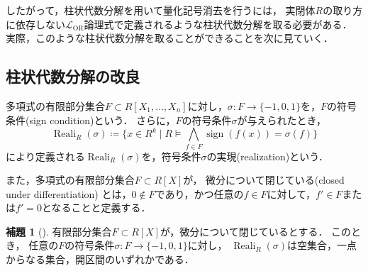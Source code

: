 \documentclass[uplatex, dvipdfmx]{jsarticle}
\numberwithin{equation}{section}
\newcommand{\Z}{\mathbb{Z}}
\newcommand{\map}[3]{{#1}\colon{#2}\rightarrow{#3}}
\DeclareMathOperator{\Reali}{Reali}
\DeclareMathOperator{\sign}{sign}
\theoremstyle{definition}
\newtheorem{proposition}[definition]{命題}
\newtheorem{lemma}[definition]{補題}
\begin{document}
したがって，柱状代数分解を用いて量化記号消去を行うには，
実閉体$R$の取り方に依存しない$\mathcal{L}_\mathrm{OR}$論理式で定義されるような柱状代数分解を取る必要がある．
実際，このような柱状代数分解を取ることができることを次に見ていく．


\subsection{柱状代数分解の改良}
多項式の有限部分集合$F \subset R[X_1, \dots, X_n]$に対し，$\map{\sigma}{F}{\{-1,0,1\}}$を，$F$の符号条件(sign condition)という．
さらに，$F$の符号条件$\sigma$が与えられたとき，
\begin{equation}
     \Reali_R(\sigma)\coloneqq \{x \in R^k \mid R \models \bigwedge_{f \in F} \sign(f(x)) = \sigma(f)\}
\end{equation}
により定義される$\Reali_R(\sigma)$を，符号条件$\sigma$の実現(realization)という．

また，多項式の有限部分集合$F \subset R[X]$が，
微分について閉じている(closed under differentiation)
とは，$0 \not \in F$であり，かつ任意の$f \in F$に対して，$f' \in F$または$f'=0$となることと定義する．



\begin{lemma}[{\cite[Lemma 5.33]{MR2248869}}]\label{lemma:Thom}
     有限部分集合$F \subset R[X]$が，微分について閉じているとする．
     このとき， 任意の$F$の符号条件$\map{\sigma}{F}{\{-1,0,1\}}$に対し，
     $\Reali_R(\sigma)$は空集合，一点からなる集合，開区間のいずれかである．
\end{lemma}
\end{document}
